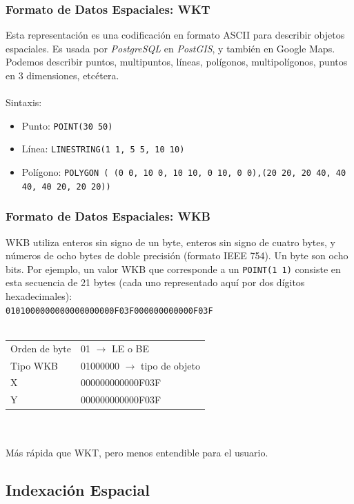\documentclass[a4paper,12pt,oneside]{report}
\begin{document}
\subsubsection*{Formato de Datos Espaciales: WKT}
Esta representaci\'on es una codificaci\'on en formato ASCII para describir objetos espaciales. Es usada por \textit{PostgreSQL} en \textit{PostGIS}, y tambi\'en en Google Maps. Podemos describir puntos, multipuntos, l\'ineas, pol\'igonos, multipol\'igonos, puntos en 3 dimensiones, etc\'etera.\\
\ \\
Sintaxis:
\begin{itemize}
\item Punto: \texttt{POINT(30 50)}
\item L\'inea: \texttt{LINESTRING(1 1, 5 5, 10 10)}
\item Pol\'igono: \texttt{POLYGON ( (0 0, 10 0, 10 10, 0 10, 0 0),(20 20, 20 40, 40 40, 40 20, 20 20))}
\end{itemize}

\subsubsection*{Formato de Datos Espaciales: WKB}
WKB utiliza enteros sin signo de un byte, enteros sin signo de cuatro bytes, y n\'umeros de ocho bytes de doble precisi\'on (formato IEEE 754). Un byte son ocho bits. Por ejemplo, un valor WKB que corresponde a un \texttt{POINT(1 1)} consiste en esta secuencia de 21 bytes (cada uno representado aquí por dos d\'igitos hexadecimales):\\
\texttt{0101000000000000000000F03F000000000000F03F}\\
\ \\
\begin{tabular}{l l}
Orden de byte & 01 $\rightarrow$ LE o BE\\
Tipo WKB	  & 01000000 $\rightarrow$ tipo de objeto\\
X & 000000000000F03F\\
Y & 000000000000F03F\\
\end{tabular}\\
\ \\
M\'as r\'apida que WKT, pero menos entendible para el usuario.

\subsection*{Indexaci\'on Espacial}
\end{document}
